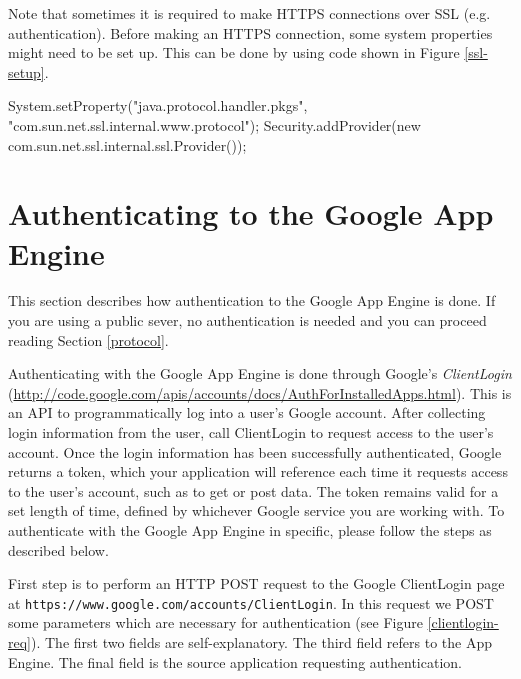 \documentclass[a4paper,10pt]{article}
\begin{document}
Note that sometimes it is required to make HTTPS connections over SSL
(e.g. authentication). Before making an HTTPS connection, some system
properties might need to be set up. This can be done by using code shown in
Figure \ref{ssl-setup}.

\begin{figure*}[ht] %
\begin{center}
\begin{code}
System.setProperty("java.protocol.handler.pkgs",
                        "com.sun.net.ssl.internal.www.protocol");
Security.addProvider(new com.sun.net.ssl.internal.ssl.Provider());
\end{code}
\caption{Setting up SSL.\label{ssl-setup}}
\end{center}
\end{figure*}

\section{Authenticating to the Google App Engine}
\label{auth}
This section describes how authentication to the Google App Engine is done. If
you are using a public sever, no authentication is needed and you can proceed
reading Section \ref{protocol}.

Authenticating with the Google App Engine is done through Google's
\emph{ClientLogin}
(\url{http://code.google.com/apis/accounts/docs/AuthForInstalledApps.html}).
This is an API to programmatically log into a user's Google account. After
collecting login information from the user, call ClientLogin to request access
to
the user's account. Once the login information has been successfully
authenticated, Google returns a token, which your application will reference
each
time it requests access to the user's account, such as to get or post data. The
token remains valid for a set length of time, defined by whichever Google
service
you are working with. To authenticate with the Google App Engine in specific,
please follow the steps as described below.

First step is to perform an HTTP POST request to the Google ClientLogin page at
\texttt{https://www.google.com/accounts/ClientLogin}. In this request we POST
some parameters which are necessary for authentication (see Figure
\ref{clientlogin-req}). The first two fields are self-explanatory. The third
field refers to the App Engine. The final field is the source application
requesting authentication.
\end{document}
